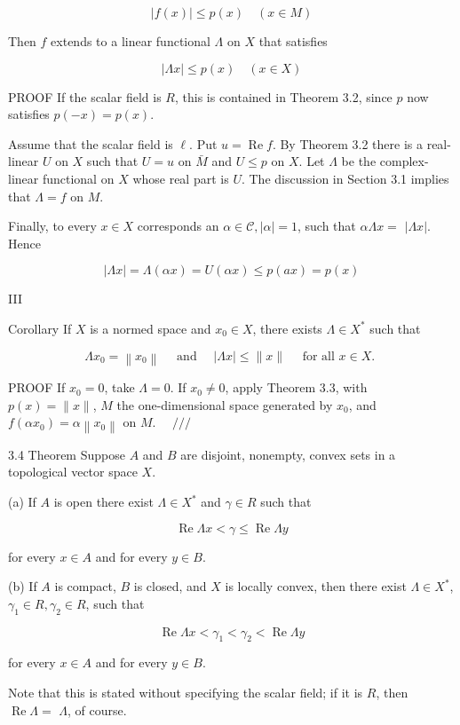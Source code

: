 \documentclass[10pt]{article}
\begin{document}
$$
|f(x)| \leq p(x) \quad(x \in M)
$$

Then $f$ extends to a linear functional $\Lambda$ on $X$ that satisfies

$$
|\Lambda x| \leq p(x) \quad(x \in X)
$$

PROOF If the scalar field is $R$, this is contained in Theorem 3.2, since $p$ now satisfies $p(-x)=p(x)$.

Assume that the scalar field is $\ell$. Put $u=\operatorname{Re} f$. By Theorem 3.2 there is a real-linear $U$ on $X$ such that $U=u$ on $\bar{M}$ and $U \leq p$ on $X$. Let $\Lambda$ be the complex-linear functional on $X$ whose real part is $U$. The discussion in Section 3.1 implies that $\Lambda=f$ on $M$.

Finally, to every $x \in X$ corresponds an $\alpha \in \mathscr{C},|\alpha|=1$, such that $\alpha \Lambda x=$ $|\Lambda x|$. Hence

$$
|\Lambda x|=\Lambda(\alpha x)=U(\alpha x) \leq p(a x)=p(x)
$$

III

Corollary If $X$ is a normed space and $x_{0} \in X$, there exists $\Lambda \in X^{*}$ such that

$$
\Lambda x_{0}=\left\|x_{0}\right\| \quad \text { and } \quad|\Lambda x| \leq\|x\| \quad \text { for all } x \in X \text {. }
$$

PROOF If $x_{0}=0$, take $\Lambda=0$. If $x_{0} \neq 0$, apply Theorem 3.3, with $p(x)=\|x\|$, $M$ the one-dimensional space generated by $x_{0}$, and $f\left(\alpha x_{0}\right)=\alpha\left\|x_{0}\right\|$ on $M$. $\quad / / /$

3.4 Theorem Suppose $A$ and $B$ are disjoint, nonempty, convex sets in a topological vector space $X$.

(a) If $A$ is open there exist $\Lambda \in X^{*}$ and $\gamma \in R$ such that

$$
\operatorname{Re} \Lambda x<\gamma \leq \operatorname{Re} \Lambda y
$$

for every $x \in A$ and for every $y \in B$.

(b) If $A$ is compact, $B$ is closed, and $X$ is locally convex, then there exist $\Lambda \in X^{*}$, $\gamma_{1} \in R, \gamma_{2} \in R$, such that

$$
\operatorname{Re} \Lambda x<\gamma_{1}<\gamma_{2}<\operatorname{Re} \Lambda y
$$

for every $x \in A$ and for every $y \in B$.

Note that this is stated without specifying the scalar field; if it is $R$, then $\operatorname{Re} \Lambda=$ $\Lambda$, of course.
\end{document}
